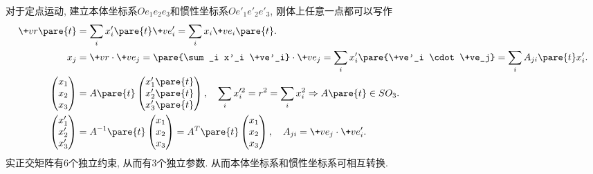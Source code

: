 \documentclass[../LectureNotes.tex]{subfiles}
\begin{document}
对于定点运动, 建立本体坐标系$Oe_1e_2e_3$和惯性坐标系$Oe'_1e'_2e'_3$, 刚体上任意一点都可以写作
\begin{align*}
    \+vr\pare{t} &= \sum_i x'_i\pare{t} \+ve'_i = \sum_i x_i \+ve_i\pare{t}. \\
    x_j &= \+vr\cdot\+ve_j = \pare{\sum_i x'_i \+ve'_i}\cdot\+ve_j = \sum_i x'_i\pare{\+ve'_i \cdot\+ve_j} = \sum_i A_{ji}\pare{t}x'_i. \\
    \begin{pmatrix}
        x_1 \\ x_2 \\ x_3
    \end{pmatrix} &= A\pare{t} \begin{pmatrix}
        x'_1\pare{t} \\ x'_2\pare{t} \\ x'_3\pare{t}
    \end{pmatrix},\quad \sum_i x'^2_i = r^2 = \sum_i x_i^2 \Rightarrow A\pare{t} \in SO_3. \\
    \begin{pmatrix}
        x'_1 \\ x'_2 \\ x'_3
    \end{pmatrix} &= A^{-1}\pare{t} \begin{pmatrix}
        x_1 \\ x_2 \\ x_3
    \end{pmatrix} = A^T\pare{t} \begin{pmatrix}
        x_1 \\ x_2 \\ x_3
    \end{pmatrix},\quad A_{ji} = \+ve_j \cdot \+ve'_i.
\end{align*}
实正交矩阵有$6$个独立约束, 从而有$3$个独立参数. 从而本体坐标系和惯性坐标系可相互转换.
\end{document}
